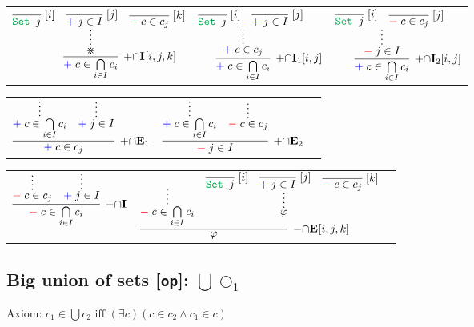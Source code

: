 \documentclass[11pt]{article}
\begin{document}
\noindent
\begin{tabular}{ccc}
$
\infer[\AssertRule{\cap}\Intro{}{[i,j,k]}]{\Assert{c\in \bigcap\limits_{i\in I}c_i}}{
    \infer*{\divideontimes}{
    	\infer[\Label{i}]{\Set{j}}{}
    	&
    	\infer[\Label{j}]{\Assert{j\in I}}{}
    	&
    	\infer[\Label{k}]{\Deny{c\in c_j}}{}
    }
}
$
\hspace{0.5cm}
&
$
\infer[\AssertRule{\cap}\Intro{1}{[i,j]}]{\Assert{c\in \bigcap\limits_{i\in I}c_i}}{
    \infer*{\Assert{c\in c_j}}{
    	\infer[\Label{i}]{\Set{j}}{}
    	&
    	\infer[\Label{j}]{\Assert{j\in I}}{}
    }
}
$
\hspace{0.5cm}
&
$
\infer[\AssertRule{\cap}\Intro{2}{[i,j]}]{\Assert{c\in \bigcap\limits_{i\in I}c_i}}{
    \infer*{\Deny{j\in I}}{
    	\infer[\Label{i}]{\Set{j}}{}
    	&
    	\infer[\Label{j}]{\Deny{c\in c_j}}{}
    }
}
$
\end{tabular}

\bigskip
\noindent

\begin{tabular}{ccc}
$
\infer[\AssertRule{\cap}\Elim{1}]{\Assert{c\in c_j}}{
	\infer*{\Assert{c\in \bigcap\limits_{i\in I}c_i}}{} 
	& 
	\infer*{\Assert{j\in I}}{}
}
$
\hspace{1cm}
&
$
\infer[\AssertRule{\cap}\Elim{2}]{\Deny{j\in I}}{
	\infer*{\Assert{c\in \bigcap\limits_{i\in I}c_i}}{} 
	& 
	\infer*{\Deny{c\in c_j}}{}
}
$
\end{tabular}

\bigskip
\noindent
\begin{tabular}{ccc}
$
\infer[\DenyRule{\cap}\Intro{}]{\Deny{c\in \bigcap\limits_{i\in I}c_i}}{
	\infer*{\Deny{c\in c_j}}{}
	& 
	\infer*{\Assert{j\in I}}{}
}
$
\hspace{1cm}
&
$
\infer[\DenyRule{\cap}\Elim{}{[i,j,k]}]{\varphi}{
	\infer*{\Deny{c\in \bigcap\limits_{i\in I}c_i}}{}
	&
	\infer*{\varphi}{
		\infer[\Label{i}]{\Set{j}}{}
		&
		\infer[\Label{j}]{\Assert{j\in I}}{}
		&
		\infer[\Label{k}]{\Deny{c\in c_j}}{}
	}
}
$
\end{tabular}
\bigskip

\newpage


\subsection*{Big union of sets [\texttt{op}]: $\bigcup\bigcirc_1$}

\smallskip
\noindent
Axiom: $c_1 \in \bigcup c_2\text{ iff }
(\exists c) (c\in c_2 \land c_1\in c)$
\smallskip
\smallskip
\end{document}
